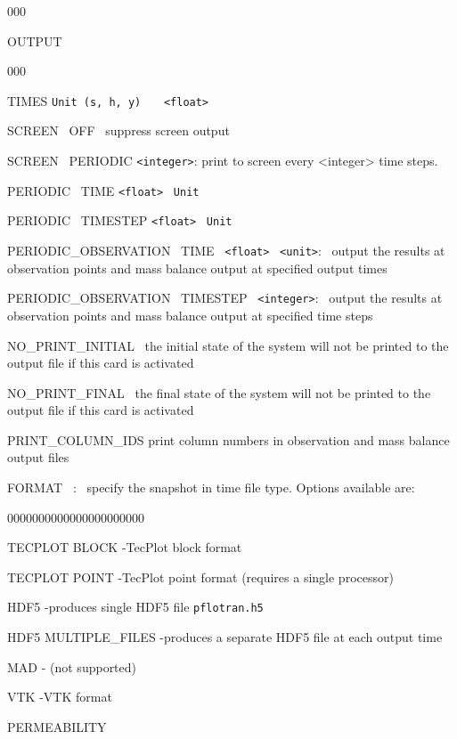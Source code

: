 \documentclass[12pt]{article}
\begin{document}
\begin{deflist}{000}
\item[OUTPUT] ~
\begin{deflist}{000}
\item[TIMES] {\tt Unit (s, h, y)} \ \ \ {\tt <float>} 
\item[SCREEN \ OFF] \ suppress screen output
\item[SCREEN \ PERIODIC] {\tt <integer>}: print to screen every <integer> time steps.
\item[PERIODIC \ TIME] {\tt <float>} \ {\tt Unit}
\item[PERIODIC \ TIMESTEP] {\tt <float>} \ {\tt Unit}
\item[PERIODIC\_OBSERVATION \ TIME] \ {\tt <float>} \ {\tt <unit>}: \ output the results at observation points and mass balance output at specified output times
\item[PERIODIC\_OBSERVATION \ TIMESTEP] \ {\tt <integer>}: \ output the results at observation points and mass balance output at specified time steps 
\item[NO\_PRINT\_INITIAL] \ the initial state of the system will not be printed to the output file if this card is activated
\item[NO\_PRINT\_FINAL] \ the final state of the system will not be printed to the output file if this card is activated
\item[PRINT\_COLUMN\_IDS] print column numbers in observation and mass balance output files
\item[FORMAT] \ <file format>: \ specify the snapshot in time file type. Options available are: 
\begin{deflist}{0000000000000000000000}
\item[TECPLOT BLOCK] -TecPlot block format
\item[TECPLOT POINT] -TecPlot point format (requires a single processor)
\item[HDF5] -produces single HDF5 file {\tt pflotran.h5}
\item[HDF5 MULTIPLE\_FILES] -produces a separate HDF5 file at each output time
\item[MAD] - (not supported)
\item[VTK] -VTK format
\end{deflist}
\item[PERMEABILITY]

\end{deflist}
\end{deflist}
\end{document}
